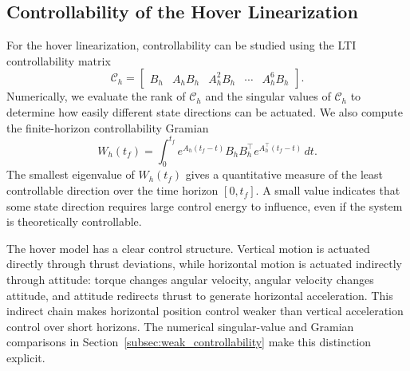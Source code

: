 \subsection{Controllability of the Hover Linearization}
\label{subsec:hover_controllability}

For the hover linearization, controllability can be studied using the LTI controllability matrix
\[
    \mathcal{C}_h
    =
    \begin{bmatrix}
        B_h & A_hB_h & A_h^2B_h & \cdots & A_h^{6}B_h
    \end{bmatrix}.
\]
Numerically, we evaluate the rank of $\mathcal{C}_h$ and the singular values of $\mathcal{C}_h$ to determine how easily different state directions can be actuated.  We also compute the finite-horizon controllability Gramian
\[
    W_h(t_f)
    =
    \int_0^{t_f} e^{A_h(t_f-t)} B_h B_h^\top e^{A_h^\top(t_f-t)}\,dt.
\]
The smallest eigenvalue of $W_h(t_f)$ gives a quantitative measure of the least controllable direction over the time horizon $[0,t_f]$.  A small value indicates that some state direction requires large control energy to influence, even if the system is theoretically controllable.

The hover model has a clear control structure.  Vertical motion is actuated directly through thrust deviations, while horizontal motion is actuated indirectly through attitude: torque changes angular velocity, angular velocity changes attitude, and attitude redirects thrust to generate horizontal acceleration.  This indirect chain makes horizontal position control weaker than vertical acceleration control over short horizons.  The numerical singular-value and Gramian comparisons in Section~\ref{subsec:weak_controllability} make this distinction explicit.
